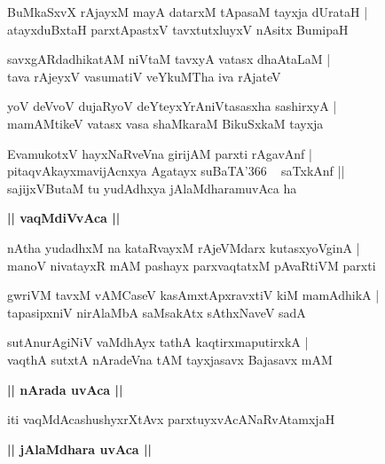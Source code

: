 \documentclass[twoside,12pt,openright]{book}
\newcounter{shloka}[chapter]
\def\uvaca#1{\centerline{{\large\textbf{#1}}}}
\begin{document}
\begin{shloka}%
BuMkaSxvX rAjayxM mayA datarxM tApasaM tayxja dUrataH |\\
atayxduBxtaH parxtApastxV tavxtutxluyxV nAsitx BumipaH 
\end{shloka}

\begin{shloka}%
savxgARdadhikatAM niVtaM tavxyA vatasx dhaAtaLaM |\\
tava rAjeyxV vasumatiV veYkuMTha iva rAjateV 
\end{shloka}

\begin{shloka}%
yoV deVvoV dujaRyoV deYteyxYrAniVtasasxha sashirxyA |\\
mamAMtikeV vatasx vasa shaMkaraM BikuSxkaM tayxja 
\end{shloka}

\begin{shloka}%
EvamukotxV hayxNaRveVna girijAM parxti rAgavAnf |\\
pitaqvAkayxmavijAcnxya Agatayx suBaTA\char'366 ~ saTxkAnf ||\\
sajijxVButaM tu yudAdhxya jAlaMdharamuvAca ha 
\end{shloka}

\uvaca{|| vaqMdiVvAca ||}

\begin{shloka}%
nAtha yudadhxM na kataRvayxM rAjeVMdarx kutasxyoVginA |\\
manoV nivatayxR mAM pashayx parxvaqtatxM pAvaRtiVM parxti
\end{shloka}

\begin{shloka}%
gwriVM tavxM vAMCaseV kasAmxtApxravxtiV kiM mamAdhikA |\\
tapasipxniV nirAlaMbA saMsakAtx sAthxNaveV sadA 
\end{shloka}

\begin{shloka}%
sutAnurAgiNiV vaMdhAyx tathA kaqtirxmaputirxkA |\\
vaqthA sutxtA nAradeVna tAM tayxjasavx Bajasavx mAM 
\end{shloka}

\uvaca{|| nArada uvAca ||}

\begin{shloka}%
iti vaqMdAcashushyxrXtAvx parxtuyxvAcANaRvAtamxjaH 
\end{shloka}

\uvaca{|| jAlaMdhara uvAca ||}
\end{document}
